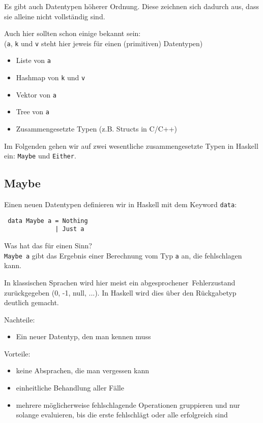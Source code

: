 \documentclass{beamer}
\begin{document}
\begin{frame}
 Es gibt auch Datentypen höherer Ordnung. Diese zeichnen sich dadurch aus, dass sie alleine nicht vollständig sind. \bigskip
 
 \pause
 Auch hier sollten schon einige bekannt sein:\\
 (\texttt{a}, \texttt{k} und \texttt{v} steht hier jeweis für einen (primitiven) Datentypen) \pause
 \begin{itemize}
  \item Liste von \texttt{a} \pause
  \item Hashmap von \texttt{k} und \texttt{v} \pause
  \item Vektor von \texttt{a} \pause
  \item Tree von \texttt{a} \pause
  \item Zusammengesetzte Typen (z.B. Structs in C/C++)
 \end{itemize}
 \pause
 Im Folgenden gehen wir auf zwei wesentliche zusammengesetzte Typen in Haskell ein: \texttt{Maybe} und \texttt{Either}.
\end{frame}


\subsection{Maybe}
\begin{frame}[fragile]
 Einen neuen Datentypen definieren wir in Haskell mit dem Keyword \texttt{data}:
 \begin{verbatim}
 data Maybe a = Nothing
              | Just a
 \end{verbatim}
 \pause
 Was hat das für einen Sinn?\\
 \pause
 \texttt{Maybe a} gibt das Ergebnis einer Berechnung vom Typ \texttt{a} an, die fehlschlagen kann.\bigskip
 
 \pause
 
 In klassischen Sprachen wird hier meist ein \glqq abgesprochener\grqq \ Fehlerzustand zurückgegeben (0, -1, null, ...). In Haskell wird dies über den Rückgabetyp deutlich gemacht.
\end{frame}

\begin{frame}[fragile]
 Nachteile:
 \begin{itemize}
  \item Ein neuer Datentyp, den man kennen muss
 \end{itemize}
 \pause
 Vorteile:
 \begin{itemize}
  \item keine Absprachen, die man vergessen kann \pause
  \item einheitliche Behandlung aller Fälle \pause
  \item mehrere möglicherweise fehlschlagende Operationen gruppieren und nur solange evaluieren, bis die erste fehlschlägt oder alle erfolgreich sind 
 \end{itemize}
\end{frame}
\end{document}

